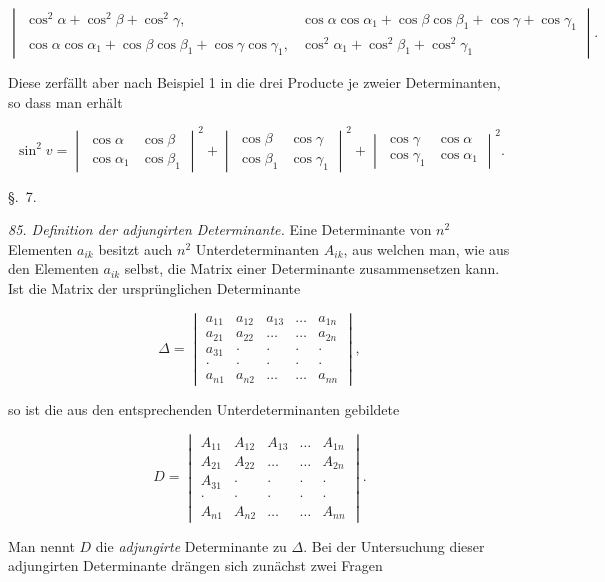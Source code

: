 \[
\begin{vmatrix}
\cos^2\alpha+\cos^2\beta+\cos^2\gamma, & \cos\alpha\cos\alpha_1+\cos\beta\cos\beta_1+\cos\gamma+\cos\gamma_1\\
\cos\alpha\cos\alpha_1+\cos\beta\cos\beta_1+\cos\gamma\cos\gamma_1, & \cos^2\alpha_1+\cos^2\beta_1+\cos^2\gamma_1
\end{vmatrix}. %
\]

Diese zerfällt aber nach Beispiel 1 in die drei Producte je zweier Determinanten, so dass man erhält

\[
\sin^2v=
\begin{vmatrix}\cos\alpha & \cos\beta\\ \cos\alpha_1 & \cos\beta_1\end{vmatrix}^2
+\begin{vmatrix}\cos\beta & \cos\gamma\\ \cos\beta_1 & \cos\gamma_1\end{vmatrix}^2
+\begin{vmatrix}\cos\gamma & \cos\alpha\\ \cos\gamma_1 & \cos\alpha_1\end{vmatrix}^2.
\]

\begin{center}
\S.\ 7.\\
\end{center}

\textit{85. Definition der adjungirten Determinante.} Eine Determinante von $n^2$ Elementen $a_{ik}$ besitzt auch $n^2$ Unterdeterminanten $A_{ik}$, aus welchen man, wie aus den Elementen $a_{ik}$ selbst, die Matrix einer Determinante zusammensetzen kann. Ist die Matrix der ursprünglichen Determinante

\[
\Delta=
\begin{vmatrix}
a_{11} & a_{12} & a_{13} & \dots & a_{1n}\\
a_{21} & a_{22} & \dots & \dots & a_{2n}\\
a_{31} & \cdot & \cdot & \cdot & \cdot\\
\cdot & \cdot & \cdot & \cdot & \cdot\\
a_{n1} & a_{n2} & \dots & \dots & a_{nn}
\end{vmatrix},
\]

so ist die aus den entsprechenden Unterdeterminanten gebildete

\[
D=
\begin{vmatrix}
A_{11} & A_{12} & A_{13} & \dots & A_{1n}\\
A_{21} & A_{22} & \dots & \dots & A_{2n}\\
A_{31} & \cdot & \cdot & \cdot & \cdot\\
\cdot & \cdot & \cdot & \cdot & \cdot\\
A_{n1} & A_{n2} & \dots & \dots & A_{nn}
\end{vmatrix}.
\]

Man nennt $D$ die \textit{adjungirte} Determinante zu $\Delta$. Bei der Untersuchung dieser adjungirten Determinante drängen sich zunächst zwei Fragen


